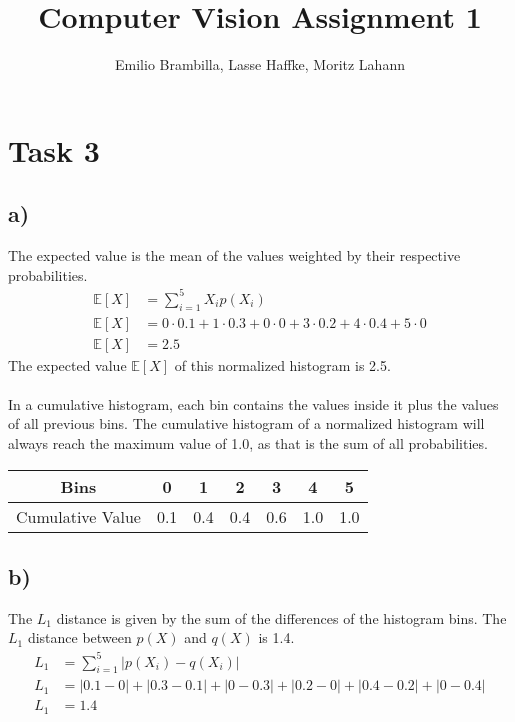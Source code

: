 \documentclass{article}
\title{Computer Vision Assignment 1}
\author{Emilio Brambilla, Lasse Haffke, Moritz Lahann}
\begin{document}
\maketitle

\section{Task 3} 
\subsection{a)}
The expected value is the mean of the values weighted by their respective probabilities.
\begin{align}
   \mathbb{E}[X] &= \sum_{i = 1}^{5} X_i p(X_i) \\
   \mathbb{E}[X] &= 0 \cdot 0.1 + 1 \cdot 0.3 + 0 \cdot 0 + 3 \cdot 0.2 + 4 \cdot 0.4 + 5 \cdot 0 \\
   \mathbb{E}[X] &= 2.5
\end{align}
The expected value $\mathbb{E}[X]$ of this normalized histogram is 2.5.
\\
\\
In a cumulative histogram, each bin contains the values inside it plus the values of all previous bins. The cumulative histogram of a normalized histogram will always reach the maximum value of 1.0, as that is the sum of all probabilities.
\begin{table}[h]
    \centering
    \begin{tabular}{c|c|c|c|c|c|c}
        Bins & 0 & 1 & 2 & 3 & 4 & 5 \\ \hline
        Cumulative Value & 0.1 & 0.4 & 0.4 & 0.6 & 1.0 & 1.0 
    \end{tabular}
\end{table}

\subsection{b)}
The $L_1$ distance is given by the sum of the differences of the histogram bins. The $L_1$ distance between $p(X)$ and $q(X)$ is 1.4.
\begin{align}
    L_1 &= \sum_{i=1}^{5} |p(X_i) - q(X_i)| \\
    L_1 &= |0.1 - 0| + |0.3 - 0.1| + |0 - 0.3| + |0.2 - 0| + |0.4 - 0.2| + |0 - 0.4| \\
    L_1 &= 1.4
\end{align}
\end{document}
